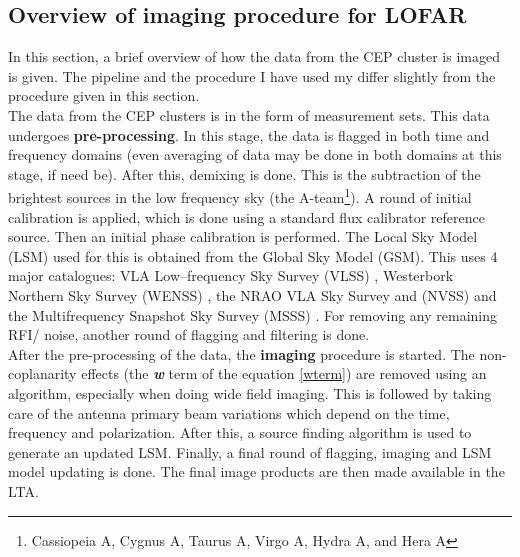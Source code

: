 \documentclass[../main/thesis_msc.tex]{subfiles}
\begin{document}
\subsection{Overview of imaging procedure for LOFAR}
\label{sec:sky_model}
In this section, a brief overview of how the data from the CEP cluster is imaged is given. The pipeline and the procedure I have used my differ slightly from the procedure given in this section. \\
\noindent The data from the CEP clusters is in the form of measurement sets. This data undergoes \textbf{pre-processing}. In this stage, the data is flagged in both time and frequency domains (even averaging of data may be done in both domains at this stage, if need be). After this, demixing is done. This is the subtraction of the brightest sources in the low frequency sky (the A-team\footnote{Cassiopeia A, Cygnus A, Taurus A, Virgo A, Hydra A, and Hera A}). A round of initial calibration is applied, which is done using a standard flux calibrator reference source. Then an initial phase calibration is performed. The Local Sky Model (LSM) used for this is obtained from the Global Sky Model (GSM). This uses 4 major catalogues: VLA Low--frequency Sky Survey (VLSS) \citep{vlss2}, Westerbork Northern Sky Survey (WENSS) \citep{wenss}, the NRAO VLA Sky Survey and (NVSS) \citep{nvss} and the Multifrequency Snapshot Sky Survey (MSSS) \citep{msss}. For removing any remaining RFI/ noise, another round of flagging and filtering is done. \\
After the pre-processing of the data, the \textbf{imaging} procedure is started. The non-coplanarity effects (the \textit{\textbf{w}} term of the equation \ref{wterm}) are removed using an algorithm, especially when doing wide field imaging. This is followed by taking care of the antenna primary beam variations which depend on the time, frequency and polarization. After this, a source finding algorithm is used to generate an updated LSM. Finally, a final round of flagging, imaging and LSM model updating is done. The final image products are then made available in the LTA.\\
\end{document}
